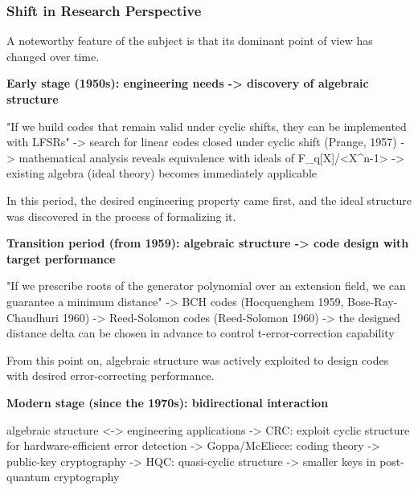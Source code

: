 \documentclass[
]{article}
\newenvironment{Shaded}{}{}
\newcommand{\NormalTok}[1]{#1}
\begin{document}
\subsubsection{Shift in Research
Perspective}\label{shift-in-research-perspective}

A noteworthy feature of the subject is that its dominant point of view has changed over time.

\textbf{Early stage (1950s): engineering needs -\textgreater{} discovery
of algebraic structure}

\begin{Shaded}
\begin{Highlighting}[]
\NormalTok{"If we build codes that remain valid under cyclic shifts, they can be implemented with LFSRs"}
\NormalTok{    {-}\textgreater{} search for linear codes closed under cyclic shift (Prange, 1957)}
\NormalTok{    {-}\textgreater{} mathematical analysis reveals equivalence with ideals of F\_q[X]/\textless{}X\^{}n{-}1\textgreater{}}
\NormalTok{    {-}\textgreater{} existing algebra (ideal theory) becomes immediately applicable}
\end{Highlighting}
\end{Shaded}

In this period, the desired engineering property came first, and the
ideal structure was discovered in the process of formalizing it.

\textbf{Transition period (from 1959): algebraic structure
-\textgreater{} code design with target performance}

\begin{Shaded}
\begin{Highlighting}[]
\NormalTok{"If we prescribe roots of the generator polynomial over an extension field, we can guarantee a minimum distance"}
\NormalTok{    {-}\textgreater{} BCH codes (Hocquenghem 1959, Bose{-}Ray{-}Chaudhuri 1960)}
\NormalTok{    {-}\textgreater{} Reed{-}Solomon codes (Reed{-}Solomon 1960)}
\NormalTok{    {-}\textgreater{} the designed distance delta can be chosen in advance to control t{-}error{-}correction capability}
\end{Highlighting}
\end{Shaded}

From this point on, algebraic structure was actively exploited to design
codes with desired error-correcting performance.

\textbf{Modern stage (since the 1970s): bidirectional interaction}

\begin{Shaded}
\begin{Highlighting}[]
\NormalTok{algebraic structure \textless{}{-}\textgreater{} engineering applications}
\NormalTok{    {-}\textgreater{} CRC: exploit cyclic structure for hardware{-}efficient error detection}
\NormalTok{    {-}\textgreater{} Goppa/McEliece: coding theory {-}\textgreater{} public{-}key cryptography}
\NormalTok{    {-}\textgreater{} HQC: quasi{-}cyclic structure {-}\textgreater{} smaller keys in post{-}quantum cryptography}
\end{Highlighting}
\end{Shaded}
\end{document}
